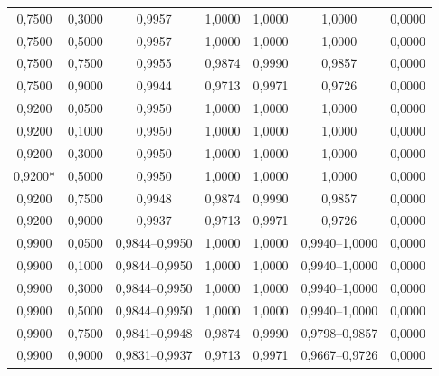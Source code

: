 \begin{longtable}{ccccccc}
0,7500 & 0,3000 & 0,9957 & 1,0000 & 1,0000 & 1,0000 & 0,0000 \\
0,7500 & 0,5000 & 0,9957 & 1,0000 & 1,0000 & 1,0000 & 0,0000 \\
0,7500 & 0,7500 & 0,9955 & 0,9874 & 0,9990 & 0,9857 & 0,0000 \\
0,7500 & 0,9000 & 0,9944 & 0,9713 & 0,9971 & 0,9726 & 0,0000 \\
0,9200 & 0,0500 & 0,9950 & 1,0000 & 1,0000 & 1,0000 & 0,0000 \\
0,9200 & 0,1000 & 0,9950 & 1,0000 & 1,0000 & 1,0000 & 0,0000 \\
0,9200 & 0,3000 & 0,9950 & 1,0000 & 1,0000 & 1,0000 & 0,0000 \\
0,9200* & 0,5000 & 0,9950 & 1,0000 & 1,0000 & 1,0000 & 0,0000 \\
0,9200 & 0,7500 & 0,9948 & 0,9874 & 0,9990 & 0,9857 & 0,0000 \\
0,9200 & 0,9000 & 0,9937 & 0,9713 & 0,9971 & 0,9726 & 0,0000 \\
0,9900 & 0,0500 & 0,9844--0,9950 & 1,0000 & 1,0000 & 0,9940--1,0000 & 0,0000 \\
0,9900 & 0,1000 & 0,9844--0,9950 & 1,0000 & 1,0000 & 0,9940--1,0000 & 0,0000 \\
0,9900 & 0,3000 & 0,9844--0,9950 & 1,0000 & 1,0000 & 0,9940--1,0000 & 0,0000 \\
0,9900 & 0,5000 & 0,9844--0,9950 & 1,0000 & 1,0000 & 0,9940--1,0000 & 0,0000 \\
0,9900 & 0,7500 & 0,9841--0,9948 & 0,9874 & 0,9990 & 0,9798--0,9857 & 0,0000 \\
0,9900 & 0,9000 & 0,9831--0,9937 & 0,9713 & 0,9971 & 0,9667--0,9726 & 0,0000 \\
\end{longtable}

